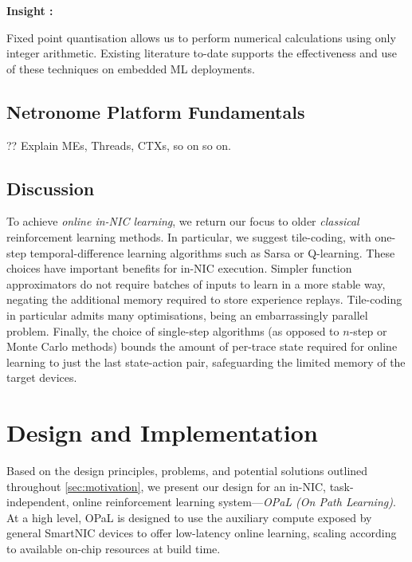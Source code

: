 \documentclass[sigconf,natbib=false]{acmart}
\newcommand{\approach}{On Path Learning}
\newcommand{\approachshort}{OPaL}
\newcounter{insightc}
\newenvironment{insight}
	{
		\begin{tipblock}\refstepcounter{insightc}\textbf{Insight \theinsightc:}\em
	}
	{
		\end{tipblock}
	}
\begin{document}
\begin{insight}
	Fixed point quantisation allows us to perform numerical calculations using only integer arithmetic.
	Existing literature to-date supports the effectiveness and use of these techniques on embedded ML deployments.
\end{insight}

\subsection{Netronome Platform Fundamentals}
?? Explain MEs, Threads, CTXs, so on so on.

\subsection{Discussion}

To achieve \emph{online in-NIC learning}, we return our focus to older \emph{classical} reinforcement learning methods.
In particular, we suggest tile-coding, with one-step temporal-difference learning algorithms such as Sarsa or Q-learning.
These choices have important benefits for in-NIC execution.
Simpler function approximators do not require batches of inputs to learn in a more stable way, negating the additional memory required to store experience replays.
Tile-coding in particular admits many optimisations, being an embarrassingly parallel problem.
Finally, the choice of single-step algorithms (as opposed to $n$-step or Monte Carlo methods) bounds the amount of per-trace state required for online learning to just the last state-action pair, safeguarding the limited memory of the target devices.

\section{Design and Implementation}\label{sec:design}
Based on the design principles, problems, and potential solutions outlined throughout \cref{sec:motivation}, we present our design for an in-NIC, task-independent, online reinforcement learning system---\emph{\approachshort{} (\approach)}.
At a high level, \approachshort{} is designed to use the auxiliary compute exposed by general SmartNIC devices to offer low-latency online learning, scaling according to available on-chip resources at build time.
\end{document}
